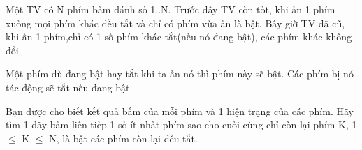 Một TV có N phím bấm đánh số 1..N. Trước đây TV còn tốt, khi ấn 1 phím xuống mọi phím khác đều tắt và chỉ có phím vừa ấn là bật. Bây giờ TV đã cũ, khi ấn 1 phím,chỉ có 1 số phím khác tắt(nếu nó đang bật), các phím khác không đổi  

   Một phím dù đang bật hay tắt khi ta ấn nó thì phím này sẽ bật. Các phím bị nó tác động sẽ tắt nếu đang bật.  

   Bạn được cho biết kết quả bấm của mỗi phím và 1 hiện trạng của các phím. Hãy tìm 1 dãy bấm liên tiếp 1 số ít nhất phím sao cho cuối cùng chỉ còn lại phím K, 1  $\le$  K  $\le$  N, là bật các phím còn lại đều tắt.